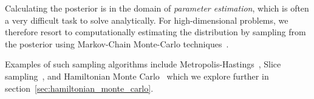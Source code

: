 \documentclass[11pt]{article}
\begin{document}
    Calculating the posterior is in the domain of \emph{parameter estimation}, which is often a very difficult task
    to solve analytically.
    For high-dimensional problems, we therefore resort to computationally estimating the distribution by sampling
    from the posterior using Markov-Chain Monte-Carlo techniques~\cite{gupta2014comparison, delmoral2013mean}.

    Examples of such sampling algorithms include Metropolis-Hastings~\cite{Metropolis_OG},
    Slice sampling~\cite{neal2003slice}, and Hamiltonian Monte Carlo~\cite{HMC_Duane, neal1996monte} which
    we explore further in section~\ref{sec:hamiltonian_monte_carlo}.
\end{document}
